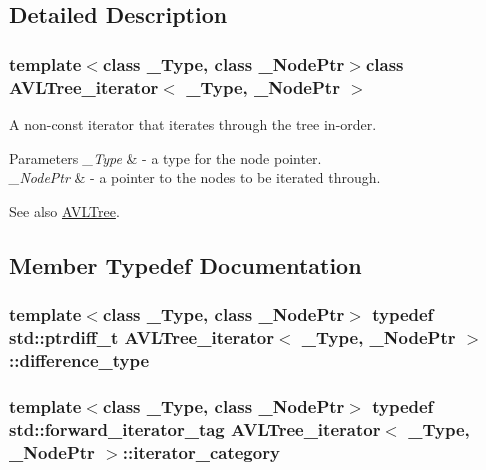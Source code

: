 \subsection{Detailed Description}
\subsubsection*{template$<$class \+\_\+\+Type, class \+\_\+\+Node\+Ptr$>$class A\+V\+L\+Tree\+\_\+iterator$<$ \+\_\+\+Type, \+\_\+\+Node\+Ptr $>$}

A non-\/const iterator that iterates through the tree in-\/order. 


\begin{DoxyParams}{Parameters}
{\em \+\_\+\+Type} & -\/ a type for the node pointer. \\
\hline
{\em \+\_\+\+Node\+Ptr} & -\/ a pointer to the nodes to be iterated through. \\
\hline
\end{DoxyParams}
\begin{DoxySeeAlso}{See also}
\hyperlink{class_a_v_l_tree}{A\+V\+L\+Tree}. 
\end{DoxySeeAlso}


\subsection{Member Typedef Documentation}
\hypertarget{class_a_v_l_tree__iterator_ac6fc6dee98fa0759f9ae3081ae6e4038}{}
\subsubsection[{difference\+\_\+type}]{\setlength{\rightskip}{0pt plus 5cm}template$<$class \+\_\+\+Type, class \+\_\+\+Node\+Ptr$>$ typedef std\+::ptrdiff\+\_\+t {\bf A\+V\+L\+Tree\+\_\+iterator}$<$ \+\_\+\+Type, \+\_\+\+Node\+Ptr $>$\+::{\bf difference\+\_\+type}}\label{class_a_v_l_tree__iterator_ac6fc6dee98fa0759f9ae3081ae6e4038}
\hypertarget{class_a_v_l_tree__iterator_aeb3e2ca18b485bfb0328a6a66e798f7e}{}
\subsubsection[{iterator\+\_\+category}]{\setlength{\rightskip}{0pt plus 5cm}template$<$class \+\_\+\+Type, class \+\_\+\+Node\+Ptr$>$ typedef std\+::forward\+\_\+iterator\+\_\+tag {\bf A\+V\+L\+Tree\+\_\+iterator}$<$ \+\_\+\+Type, \+\_\+\+Node\+Ptr $>$\+::{\bf iterator\+\_\+category}}\label{class_a_v_l_tree__iterator_aeb3e2ca18b485bfb0328a6a66e798f7e}
\hypertarget{class_a_v_l_tree__iterator_ab3060d2f8d96febec03250b59b9d6c5b}{}
